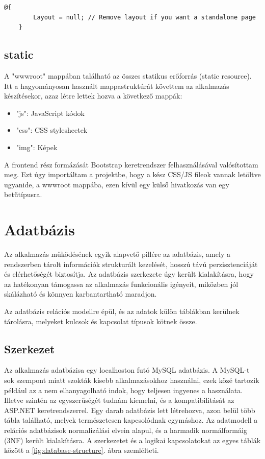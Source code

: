 \begin{lstlisting}[language={[Sharp]C}]
	@{
		Layout = null; // Remove layout if you want a standalone page
	}
\end{lstlisting}

\subsection{static}
A "wwwroot" mappában található az összes statikus erőforrás (static resource). Itt a hagyományosan használt mappastruktúrát követtem az alkalmazás készítésekor, azaz létre lettek hozva a következő mappák:
\begin{itemize}
	\item "js": JavaScript kódok
	\item "css": CSS stylesheetek
	\item "img": Képek  
\end{itemize}
A frontend rész formázását Bootstrap keretrendszer felhasználásával valósítottam meg. Ezt úgy importáltam a projektbe, hogy a kész CSS/JS fileok vannak letöltve ugyanide, a wwwroot mappába, ezen kívül egy külső hivatkozás van egy betűtípusra. 

\section{Adatbázis}
Az alkalmazás működésének egyik alapvető pillére az adatbázis, amely a rendszerben tárolt információk strukturált kezelését, hosszú távú perzisztenciáját és elérhetőségét biztosítja. Az adatbázis szerkezete úgy került kialakításra, hogy az hatékonyan támogassa az alkalmazás funkcionális igényeit, miközben jól skálázható és könnyen karbantartható maradjon.

Az adatbázis relációs modellre épül, és az adatok külön táblákban kerülnek tárolásra, melyeket kulcsok és kapcsolat típusok kötnek össze.

\subsection{Szerkezet}
Az alkalmazás adatbázisa egy localhoston futó MySQL adatbázis.
A MySQL-t sok szempont miatt szokták kisebb alkalmazásokhoz
használni, ezek közé tartozik például az a nem elhanyagolható
indok, hogy teljesen ingyenes a használata. Illetve szintén
az egyszerűségét tudnám kiemelni, és a kompatibilitását az ASP.NET keretrendszerrel. Egy darab adatbázis lett létrehozva, azon belül több tábla található, melyek természetesen kapcsolódnak egymáshoz. Az adatmodell a relációs adatbázisok normalizálási elvein alapul, és a harmadik normálformáig (3NF) került kialakításra.
A szerkezetet és a logikai kapcsolatokat az egyes táblák között a \ref{fig:database-structure}. ábra szemlélteti.

